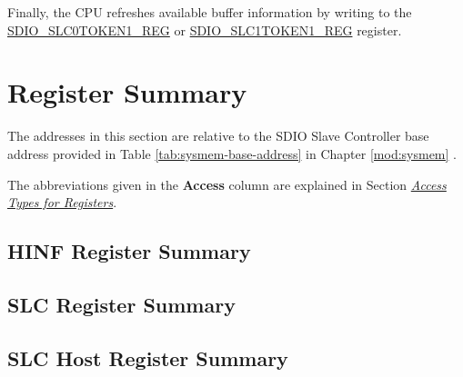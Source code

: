 \documentclass[main\_\_EN.tex]{subfiles}
\begin{document}
Finally, the CPU refreshes available buffer information by writing to the \hyperref[regdesc:SDIOSLC0TOKEN1REG]{SDIO\_SLC0TOKEN1\_REG} or \hyperref[regdesc:SDIOSLC1TOKEN1REG]{SDIO\_SLC1TOKEN1\_REG} register.





\clearpage
\hypertarget{sdioslave-reg-summ}{}
\section{Register Summary}
\label{sec:sdioslave-reg-summ}

The addresses in this section are relative to the SDIO Slave Controller base address provided in Table \ref{tab:sysmem-base-address} in Chapter \ref{mod:sysmem} \textit{}.

The abbreviations given in the \textbf{Access} column are explained in Section \hyperref[glossary-access-types]{\textit{Access Types for Registers}}.

\subsection{HINF Register Summary}
\label{sec:sdioslave-hinf-reg-summ}



\subsection{SLC Register Summary}
\label{sec:sdioslave-slc-reg-summ}



\subsection{SLC Host Register Summary}
\label{sec:sdioslave-slc-host-reg-summ}



\end{document}
